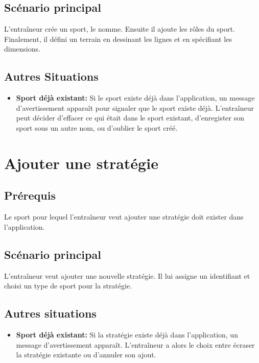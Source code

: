 \subsection{Sc\'enario principal}
\label{sub:sc'enario_principal}

L'entra\^ineur cr\'ee un sport, le nomme.
Ensuite il ajoute les r\^oles du sport.
Finalement, il d\'efini un terrain en dessinant les lignes et en sp\'ecifiant les dimensions.

\subsection{Autres Situations}
\label{sub:autres_situations}
\begin{itemize}
    \item \textbf{Sport d\'ej\`a existant:} Si le sport existe d\'ej\`a dans l'application, un message d'avertissement appara\^it pour signaler que le sport existe d\'ej\`a.
    L'entraîneur peut d\'ecider d'effacer ce qui \'etait dans le sport existant, d'enregister son sport sous un autre nom, ou d'oublier le sport cr\'e\'e.
\end{itemize}


\section{Ajouter une strat\'egie}
\label{sec:ajouter_une_strat'egie}

\subsection{Pr\'erequis}
\label{sub:prerequis}

Le sport pour lequel l'entraîneur veut ajouter une stratégie doit exister dans l'application.

\subsection{Sc\'enario principal}
\label{sub:sc'enario_principal}

L'entra\^ineur veut ajouter une nouvelle strat\'egie.
Il lui assigne un identifiant et choisi un type de sport pour la strat\'egie.

\subsection{Autres situations}
\label{sub:autres_situations}
\begin{itemize}
    \item \textbf{Sport d\'ej\`a existant:} Si la stratégie existe d\'ej\`a dans l'application, un message d'avertissement appara\^it.
        L'entra\^ineur a alors le choix entre \'ecraser la strat\'egie existante ou d'annuler son ajout.
\end{itemize}



